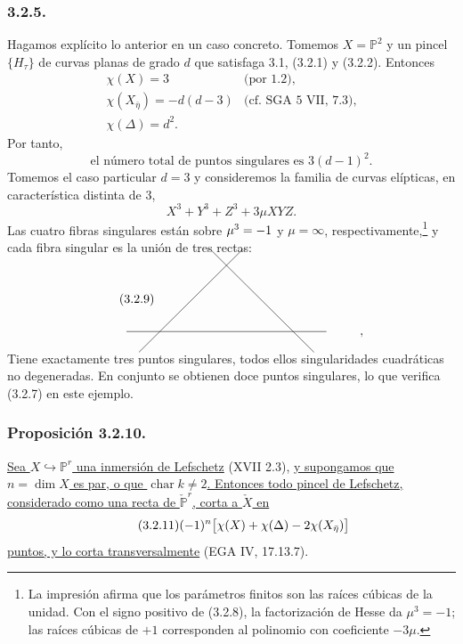 \subsubsection*{3.2.5.}
Hagamos explícito lo anterior en un caso concreto. Tomemos
$X=\mathbb P^2$ y un pincel $\{H_\tau\}$ de curvas planas de grado $d$
que satisfaga 3.1, (3.2.1) y (3.2.2). Entonces
\begin{equation}\tag{3.2.6}
\begin{array}{ll}
\chi(X)=3 & \text{(por 1.2)},\\[4pt]
\chi(X_{\bar\eta})=-d(d-3) & \text{(cf. SGA 5 VII, 7.3)},\\[4pt]
\chi(\Delta)=d^2.&
\end{array}
\end{equation}
Por tanto,
\begin{equation}\tag{3.2.7}
\text{el número total de puntos singulares es }3(d-1)^2.
\end{equation}
Tomemos el caso particular $d=3$ y consideremos la familia de curvas
elípticas, en característica distinta de $3$,
\begin{equation}\tag{3.2.8}
X^3+Y^3+Z^3+3\mu XYZ.
\end{equation}
Las cuatro fibras singulares están sobre
$\mu^3=\sisi{1}{-1}$ y $\mu=\infty$, respectivamente,\footnote{La
impresión afirma que los parámetros finitos son las raíces cúbicas de
la unidad. Con el signo positivo de (3.2.8), la factorización de Hesse
da $\mu^3=-1$; las raíces cúbicas de $+1$ corresponden al polinomio
con coeficiente $-3\mu$.}
y cada fibra singular es la unión de tres rectas:
\begin{equation}\tag{3.2.9}
\begin{tikzcd}[row sep=4.5em,column sep=4.5em]
{} & {} \arrow[dl,dash,shorten <=-9mm,shorten >=-9mm]
        \arrow[dr,dash,shorten <=-9mm,shorten >=-9mm] & {} & {} \\
{} \arrow[rr,dash,shorten <=-11mm,shorten >=-11mm] & {} & {} & {,}
\end{tikzcd}
\end{equation}
Tiene exactamente tres puntos singulares, todos ellos singularidades
cuadráticas no degeneradas. En conjunto se obtienen doce puntos
singulares, lo que verifica (3.2.7) en este ejemplo.

\pageoriginale

\subsubsection*{Proposición 3.2.10.}
\underline{Sea $X\hookrightarrow\mathbb P^r$ una inmersión de Lefschetz}
(XVII 2.3), \underline{y supongamos que $n=\dim X$ es par, o que
$\operatorname{char}k\ne2$. Entonces todo pincel de Lefschetz,
considerado como una recta de $\check{\mathbb P}^{r}$, corta a
$\check X$ en}
\begin{equation}\tag{3.2.11}
(-1)^{\sisi{\eta}{n}}
\bigl[\chi(X)+\chi(\Delta)-2\chi(X_{\bar\eta})\bigr]
\end{equation}
\underline{puntos, y lo corta transversalmente} (EGA IV, 17.13.7).

